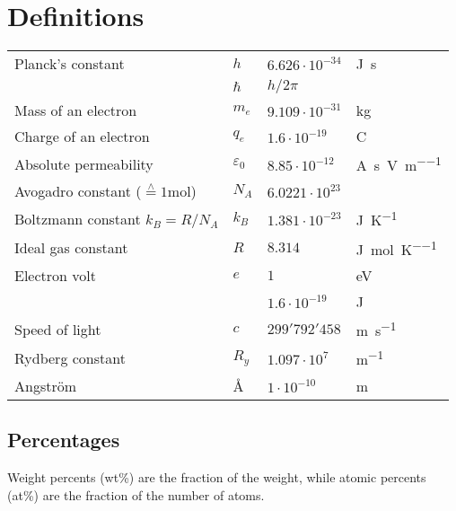 \section{Definitions}

\begin{table*}[ht]
    \begin{tabularx}{\linewidth}{Xlll}
        \toprule
    	Planck's constant & $h$ & $6.626 \cdot 10^{-34}$ & \si{\J\second} \\
    		& $\hbar$ & $h / 2\pi$ & \\
    	Mass of an electron & $m_e$ &  $9.109 \cdot 10^{-31}$ & \si{\kilogram} \\
    	Charge of an electron & $q_e$ & $1.6 \cdot 10^{-19}$ & \si{\coulomb} \\
    	Absolute permeability & $\varepsilon_0$ & $8.85 \cdot 10^{-12}$ & \si{\ampere\second\per\volt\per\meter} \\
    	Avogadro constant  ($\stackrel{\wedge}{=}1$\si{\mol})& $N_A$ & $6.0221 \cdot 10^{23}$ & \\
    	Boltzmann constant $k_B = R / N_A$& $k_B$ & $1.381 \cdot10^{-23}$ & \si{\J\per\K} \\
    	Ideal gas constant & $R$ & $8.314$ & \si{\J\per\mol\per\K} \\
    	Electron volt & $e$ & $1$ & \si{\eV} \\
    		& & $1.6 \cdot 10^{-19}$ & \si{\J} \\ 
    	Speed of light & $c$ & $299'792'458$ & \si{\meter\per\second} \\
    	Rydberg constant & $R_y$ & $1.097 \cdot 10^{7}$ & \si{\meter\tothe{-1}} \\
    	Angström & \AA & $1 \cdot 10^{-10}$ & \si{\meter} \\
    	\bottomrule
    \end{tabularx}
\end{table*}

\subsection{Percentages}
Weight percents (wt\%) are the fraction of the weight, while atomic percents (at\%) are the fraction of the number of atoms.